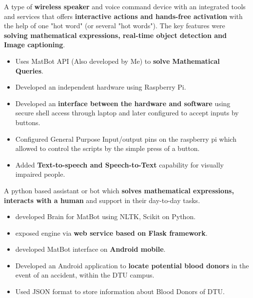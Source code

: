 
 A type of \textbf{wireless speaker} and voice command device with an integrated tools and services that offers \textbf{interactive actions and hands-free activation} with the help of one "hot word" (or several "hot words"). The key features were \textbf{solving mathematical expressions, real-time object detection and Image captioning}.
\begin{itemize}
 \item Uses MatBot API (Also developed by Me) to \textbf{solve Mathematical Queries}.
 \item Developed an independent hardware using Raspberry Pi.
 \item Developed an\textbf{ interface between the hardware and software} using secure shell access through laptop and later configured to accept inputs by buttons.
 \item Configured General Purpose Input/output pins on the raspberry pi which allowed to control the scripts by the simple press of a button.
 \item Added \textbf{Text-to-speech and Speech-to-Text} capability for visually impaired people.
\end{itemize}
\sidedivider

A python based assistant or bot which \textbf{solves mathematical expressions, interacts with a human} and support in their day-to-day tasks.
\begin{itemize}
 \item developed Brain for MatBot using NLTK, Scikit on Python.
 \item exposed engine via \textbf{web service based on Flask framework}.
 \item developed MatBot interface on \textbf{Android mobile}.
\end{itemize}
\sidedivider

\begin{itemize}
 \item Developed an Android application to \textbf{ locate potential blood donors} in the event of an accident, within the DTU campus.
 \item Used JSON format to store information about Blood Donors of DTU.
\end{itemize}